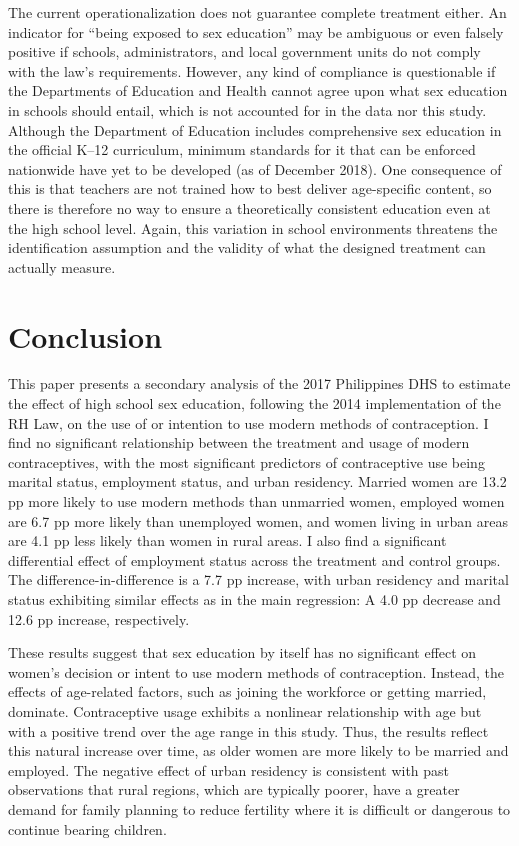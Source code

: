 \documentclass[12pt]{article}
\begin{document}
    The current operationalization does not guarantee complete treatment either.
    An indicator for ``being exposed to sex education'' may be ambiguous or even falsely positive if schools, administrators, and local government units do not comply with the law's requirements.
    However, any kind of compliance is questionable if the Departments of Education and Health cannot agree upon what sex education in schools should entail, which is not accounted for in the data nor this study.
    Although the Department of Education includes comprehensive sex education in the official K--12 curriculum, minimum standards for it that can be enforced nationwide have yet to be developed (as of December 2018).
    One consequence of this is that teachers are not trained how to best deliver age-specific content, so there is therefore no way to ensure a theoretically consistent education even at the high school level. 
    Again, this variation in school environments threatens the identification assumption and the validity of what the designed treatment can actually measure.


\section{Conclusion}
This paper presents a secondary analysis of the 2017 Philippines DHS to estimate the effect of high school sex education, following the 2014 implementation of the RH Law, on the use of or intention to use modern methods of contraception.
I find no significant relationship between the treatment and usage of modern contraceptives, with the most significant predictors of contraceptive use being marital status, employment status, and urban residency.
Married women are 13.2 pp more likely to use modern methods than unmarried women, employed women are 6.7 pp more likely than unemployed women, and women living in urban areas are 4.1 pp less likely than women in rural areas.
I also find a significant differential effect of employment status across the treatment and control groups.
The difference-in-difference is a 7.7 pp increase, with urban residency and marital status exhibiting similar effects as in the main regression: A 4.0 pp decrease and 12.6 pp increase, respectively.

These results suggest that sex education by itself has no significant effect on women's decision or intent to use modern methods of contraception.
Instead, the effects of age-related factors, such as joining the workforce or getting married, dominate.
Contraceptive usage exhibits a nonlinear relationship with age but with a positive trend over the age range in this study.
Thus, the results reflect this natural increase over time, as older women are more likely to be married and employed.
The negative effect of urban residency is consistent with past observations that rural regions, which are typically poorer, have a greater demand for family planning to reduce fertility where it is difficult or dangerous to continue bearing children.
\end{document}
